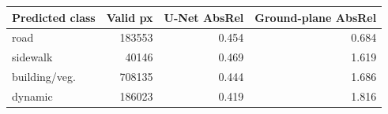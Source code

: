 \begin{tabular}{lrrr}
\toprule
Predicted class & Valid px & U-Net AbsRel & Ground-plane AbsRel \\
\midrule
road & 183553 & 0.454 & 0.684 \\
sidewalk & 40146 & 0.469 & 1.619 \\
building/veg. & 708135 & 0.444 & 1.686 \\
dynamic & 186023 & 0.419 & 1.816 \\
\bottomrule
\end{tabular}
